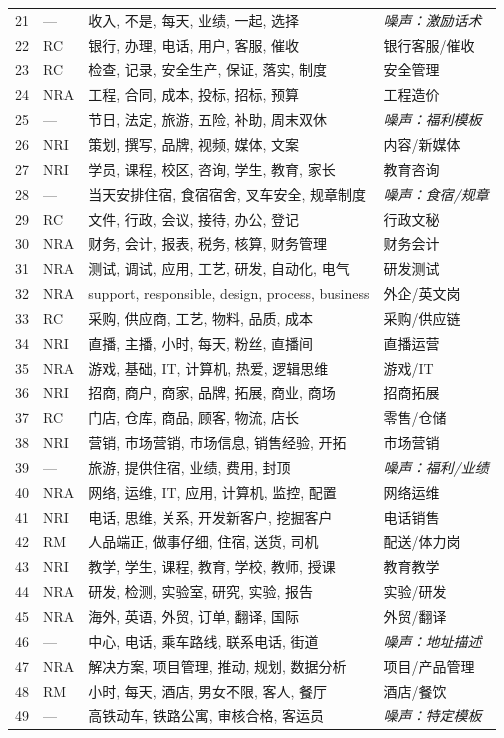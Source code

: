 \documentclass[12pt, a4paper]{article}
\begin{document}
\begin{longtable}{clp{8.5cm}l}
\rowcolor[gray]{0.9}
21 & --- & 收入, 不是, 每天, 业绩, 一起, 选择 & \textit{噪声：激励话术} \\
22 & RC  & 银行, 办理, 电话, 用户, 客服, 催收 & 银行客服/催收 \\
23 & RC  & 检查, 记录, 安全生产, 保证, 落实, 制度 & 安全管理 \\
24 & NRA & 工程, 合同, 成本, 投标, 招标, 预算 & 工程造价 \\
\rowcolor[gray]{0.9}
25 & --- & 节日, 法定, 旅游, 五险, 补助, 周末双休 & \textit{噪声：福利模板} \\
26 & NRI & 策划, 撰写, 品牌, 视频, 媒体, 文案 & 内容/新媒体 \\
27 & NRI & 学员, 课程, 校区, 咨询, 学生, 教育, 家长 & 教育咨询 \\
\rowcolor[gray]{0.9}
28 & --- & 当天安排住宿, 食宿宿舍, 叉车安全, 规章制度 & \textit{噪声：食宿/规章} \\
29 & RC  & 文件, 行政, 会议, 接待, 办公, 登记 & 行政文秘 \\
30 & NRA & 财务, 会计, 报表, 税务, 核算, 财务管理 & 财务会计 \\
31 & NRA & 测试, 调试, 应用, 工艺, 研发, 自动化, 电气 & 研发测试 \\
32 & NRA & support, responsible, design, process, business & 外企/英文岗 \\
33 & RC  & 采购, 供应商, 工艺, 物料, 品质, 成本 & 采购/供应链 \\
34 & NRI & 直播, 主播, 小时, 每天, 粉丝, 直播间 & 直播运营 \\
35 & NRA & 游戏, 基础, IT, 计算机, 热爱, 逻辑思维 & 游戏/IT \\
36 & NRI & 招商, 商户, 商家, 品牌, 拓展, 商业, 商场 & 招商拓展 \\
37 & RC  & 门店, 仓库, 商品, 顾客, 物流, 店长 & 零售/仓储 \\
38 & NRI & 营销, 市场营销, 市场信息, 销售经验, 开拓 & 市场营销 \\
\rowcolor[gray]{0.9}
39 & --- & 旅游, 提供住宿, 业绩, 费用, 封顶 & \textit{噪声：福利/业绩} \\
40 & NRA & 网络, 运维, IT, 应用, 计算机, 监控, 配置 & 网络运维 \\
41 & NRI & 电话, 思维, 关系, 开发新客户, 挖掘客户 & 电话销售 \\
42 & RM  & 人品端正, 做事仔细, 住宿, 送货, 司机 & 配送/体力岗 \\
43 & NRI & 教学, 学生, 课程, 教育, 学校, 教师, 授课 & 教育教学 \\
44 & NRA & 研发, 检测, 实验室, 研究, 实验, 报告 & 实验/研发 \\
45 & NRA & 海外, 英语, 外贸, 订单, 翻译, 国际 & 外贸/翻译 \\
\rowcolor[gray]{0.9}
46 & --- & 中心, 电话, 乘车路线, 联系电话, 街道 & \textit{噪声：地址描述} \\
47 & NRA & 解决方案, 项目管理, 推动, 规划, 数据分析 & 项目/产品管理 \\
48 & RM  & 小时, 每天, 酒店, 男女不限, 客人, 餐厅 & 酒店/餐饮 \\
\rowcolor[gray]{0.9}
49 & --- & 高铁动车, 铁路公寓, 审核合格, 客运员 & \textit{噪声：特定模板} \\
\end{longtable}
\end{document}
